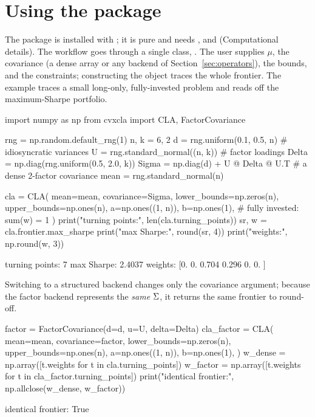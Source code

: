 \section{Using the package}
\label{sec:usage}

The package \citep{cvxcla} is installed with ; it is pure
 and needs ,  and 
(Computational details). The workflow goes through a single class, . The user supplies $\mu$, the
covariance (a dense array or any backend of Section~\ref{sec:operators}), the bounds, and
the constraints; constructing the object traces the whole frontier. The example traces
a small long-only, fully-invested problem and reads off the maximum-Sharpe portfolio.

\begin{CodeChunk}
\begin{CodeInput}
import numpy as np
from cvxcla import CLA, FactorCovariance

rng = np.random.default_rng(1)
n, k = 6, 2
d = rng.uniform(0.1, 0.5, n)            # idiosyncratic variances
U = rng.standard_normal((n, k))         # factor loadings
Delta = np.diag(rng.uniform(0.5, 2.0, k))
Sigma = np.diag(d) + U @ Delta @ U.T    # a dense 2-factor covariance
mean = rng.standard_normal(n)

cla = CLA(
    mean=mean, covariance=Sigma,
    lower_bounds=np.zeros(n), upper_bounds=np.ones(n),
    a=np.ones((1, n)), b=np.ones(1),    # fully invested: sum(w) = 1
)
print("turning points:", len(cla.turning_points))
sr, w = cla.frontier.max_sharpe
print("max Sharpe:", round(sr, 4))
print("weights:", np.round(w, 3))
\end{CodeInput}
\begin{CodeOutput}
turning points: 7
max Sharpe: 2.4037
weights: [0.    0.    0.704 0.296 0.    0.   ]
\end{CodeOutput}
\end{CodeChunk}

Switching to a structured backend changes only the covariance argument; because the
factor backend represents the \emph{same} $\Sigma$, it returns the same frontier to round-off.

\begin{CodeChunk}
\begin{CodeInput}
factor = FactorCovariance(d=d, u=U, delta=Delta)
cla_factor = CLA(
    mean=mean, covariance=factor,
    lower_bounds=np.zeros(n), upper_bounds=np.ones(n),
    a=np.ones((1, n)), b=np.ones(1),
)
w_dense = np.array([t.weights for t in cla.turning_points])
w_factor = np.array([t.weights for t in cla_factor.turning_points])
print("identical frontier:", np.allclose(w_dense, w_factor))
\end{CodeInput}
\begin{CodeOutput}
identical frontier: True
\end{CodeOutput}
\end{CodeChunk}

